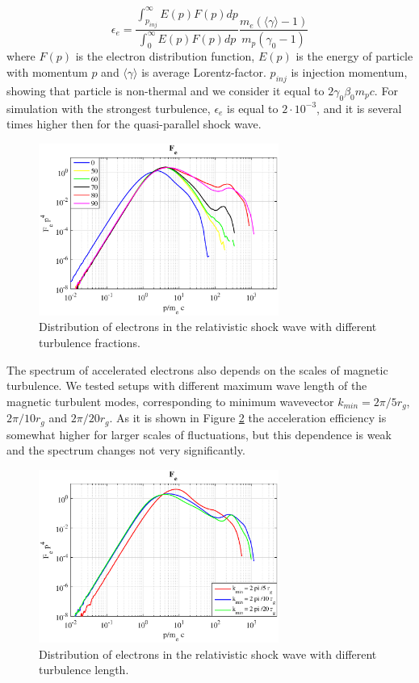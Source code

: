 \documentclass[a4paper]{jpconf}
\begin{document}
\begin{equation}
\epsilon_e = \frac{\int_{p_{inj}}^{\infty}E(p)F(p)dp}{\int_{0}^{\infty}E(p)F(p)dp }\frac{m_e(\langle \gamma \rangle - 1)}{m_p (\gamma_0 - 1)}
\end{equation}
where $F(p)$ is the electron distribution function, $E(p)$ is the energy of particle with momentum $p$ and $\langle \gamma \rangle$ is average Lorentz-factor. $p_{inj}$ is injection momentum, showing that particle is non-thermal and we consider it equal to $2 \gamma_0 \beta_0 m_p c$. For simulation with the strongest turbulence, $\epsilon_e$ is equal to $2\cdot10^{-3}$, and it is several times higher then for the quasi-parallel shock wave.
\begin{figure}[h!]
	\centering
	\includegraphics[width=0.7\textwidth]{fig/spectrum.eps} 
	\caption{Distribution of electrons in the relativistic shock wave with different turbulence fractions.}
	\label{spectrum}
\end{figure} 

The spectrum of accelerated electrons also depends on the scales of magnetic turbulence. We tested setups with different maximum wave length of the magnetic turbulent modes, corresponding to minimum wavevector $k_{min} = 2 \pi / 5 r_g$, $2 \pi / 10 r_g$ and $ 2 \pi /20 r_g$. As it is shown in Figure \ref{spectrum_length} the acceleration efficiency is somewhat higher for larger scales of fluctuations, but this dependence is weak and the spectrum changes not very significantly.

\begin{figure}[h!]
	\centering
	\includegraphics[width=0.7\textwidth]{fig/spectrum_length.eps} 
	\caption{Distribution of electrons in the relativistic shock wave with different turbulence length.}
	\label{spectrum_length}
\end{figure} 
\end{document}
